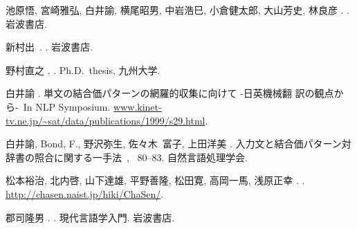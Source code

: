 \documentclass[japanese]{jnlp}
\begin{document}
\begin{thebibliography}{}
池原悟, 宮崎雅弘, 白井{諭}, 横尾昭男, 中岩浩巳, 小倉健太郎, 大山芳史, 林良彦
  \BBCP.
\newblock {}.
\newblock 岩波書店.

新村出\JED\ \BBCP.
\newblock {}.
\newblock 岩波書店.

野村直之 \BBCP.
\newblock {}.
\newblock Ph.D.\ thesis, 九州大学.

白井諭 \BBCP.
\newblock \JBOQ 単文の結合価パターンの網羅的収集に向けて -日英機械翻
  訳の観点から-\JBCQ\
\newblock In {\Bem NLP Symposium}.
\newblock \url{www.kinet-tv.ne.jp/~sat/data/publications/1999/s29.html}.

白井諭, Bond, F., 野沢弥生, 佐々木~富子, 上田洋美 \BBCP.
\newblock \JBOQ 入力文と結合価パターン対辞書の照合に関する一手法\JBCQ\
\newblock {}, \BPGS\ 80--83. 自然言語処理学会.

松本裕治, 北内啓, 山下達雄, 平野善隆, 松田寛, 高岡一馬, 浅原正幸 \BBOP
  2003\BBCP.
\newblock {}.
\newblock \url{http://chasen.naist.jp/hiki/ChaSen/}.

郡司隆男 \BBCP.
\newblock \Jem{単語と文の構造}.
\newblock 現代言語学入門. 岩波書店.

\end{thebibliography}
\end{document}
